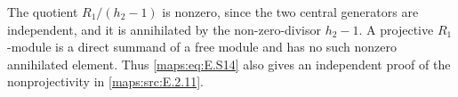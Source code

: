 \item The quotient $R_1/(h_2-1)$ is nonzero, since the two central
generators are independent, and it is annihilated by the
non-zero-divisor $h_2-1$. A projective $R_1$-module is a
direct summand of a free module and has no such nonzero
annihilated element. Thus \eqref{maps:eq:E.S14} also gives an independent
proof of the nonprojectivity in \ref{maps:src:E.2.11}. 
